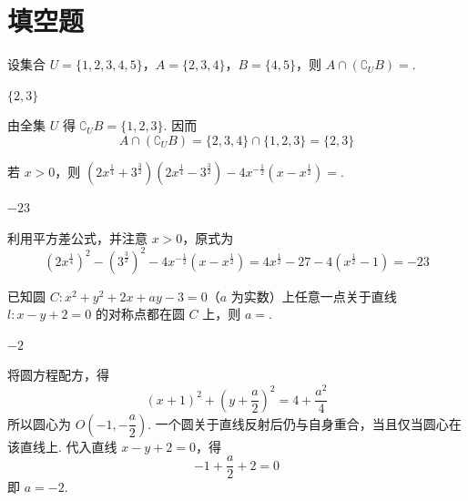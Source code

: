 \section{填空题}

\begin{problem}
设集合 \(U = \{1, 2, 3, 4, 5\}\)，\(A = \{2, 3, 4\}\)，\(B = \{4, 5\}\)，则 \(A \cap (\complement_U B) =\)\fillinblank{}.
\end{problem}

\begin{answer}
\(\{2,3\}\)
\end{answer}

\begin{solution}
由全集 \(U\) 得 \(\complement_{U}B=\{1,2,3\}\). 因而
\[
A\cap\left(\complement_{U}B\right)=\{2,3,4\}\cap\{1,2,3\}=\{2,3\}
\]
\end{solution}

\begin{problem}
若 \(x > 0\)，则 \(\left(2x^{\frac{1}{4}} + 3^{\frac{3}{2}}\right)\left(2x^{\frac{1}{4}} - 3^{\frac{3}{2}}\right) - 4x^{-\frac{1}{2}}\left(x - x^{\frac{1}{2}}\right) =\)\fillinblank{}.
\end{problem}

\begin{answer}
\(-23\)
\end{answer}

\begin{solution}
利用平方差公式，并注意 \(x>0\)，原式为
\[
\left(2x^{\frac14}\right)^{2}-\left(3^{\frac32}\right)^{2}-4x^{-\frac12}\left(x-x^{\frac12}\right)
=4x^{\frac12}-27-4\left(x^{\frac12}-1\right)=-23
\]
\end{solution}

\begin{problem}
已知圆 \(C: x^{2} + y^{2} + 2x + ay - 3 = 0\)（\(a\) 为实数）上任意一点关于直线 \(l: x - y + 2 = 0\) 的对称点都在圆 \(C\) 上，则 \(a = \)\fillinblank{}.
\end{problem}

\begin{answer}
\(-2\)
\end{answer}

\begin{solution}
将圆方程配方，得
\[
\left(x+1\right)^{2}+\left(y+\frac{a}{2}\right)^{2}=4+\frac{a^{2}}{4}
\]
所以圆心为 \(O\left(-1,-\dfrac{a}{2}\right)\). 一个圆关于直线反射后仍与自身重合，当且仅当圆心在该直线上. 代入直线 \(x-y+2=0\)，得
\[
-1+\frac{a}{2}+2=0
\]
即 \(a=-2\).
\end{solution}

